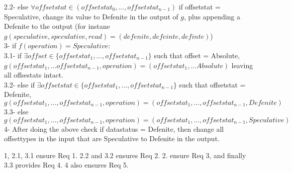 \documentclass[a4paper, 11pt]{article}
\begin{document}
\hspace{ 8mm}
	2.2- else $\forall offsetstat \in (offsetstat_0, ..., offsetstat_{n-1})$ if offsetstat = Speculative, change its value to Defenite in the output of $g$, plus appending a Defenite to the output (for instane $g(speculative, speculative, read) = (defenite, defeinte, definte)$)\\

3- if $f(operation) = Speculative$:\\

\hspace{ 8mm}
	3.1- if $\exists offset \in \{offsetstat_1, ..., offsetstat_{n-1}\}$ such that offset = Absolute, $g(offsetstat_1, ... offsetstat_{n-1}, operation) = (offsetstat_1, ... Absolute)$ leaving all offsestats intact.\\ 

\hspace{ 8mm}
	3.2- else if $\exists offsetstat \in \{offsetstat_1, ..., offsetstat_{n-1}\}$ such that offsetstat = {Defenite},  $g(offsetstat_1, ...,  offsetstat_{n-1}, operation) = (offsetstat_1 ,..., offsetstat_{n-1}, Defenite)$\\

\hspace{ 8mm}
	3.3- else $g(offsetstat_1, ..., offsetstat_{n-1}, operation) = (offsetstat_1, ..., offsetstat_{n-1}, Speculative)$\\

4- After doing the above check if datastatus = Defenite, then change all offsettypes in the input that are Speculative to Defenite in the output.

1, 2.1, 3.1 ensure Req 1. 2.2 and 3.2 ensures Req 2. 2. ensure Req 3, and finally 3.3 provides Req 4. 4 also ensures Req 5. 











\end{document}
